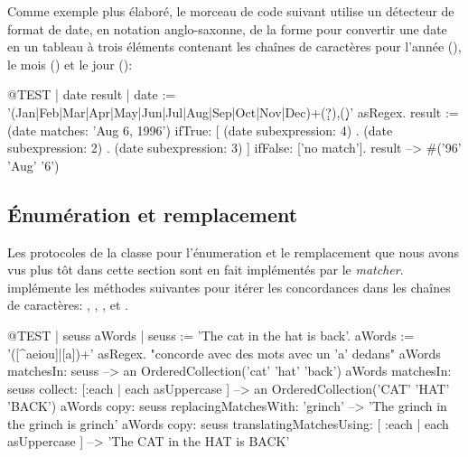 \documentclass[a4paper,10pt,twoside]{book}
\begin{document}
Comme exemple plus élaboré, le morceau de code suivant utilise un
détecteur de format de date,
en notation anglo-saxonne,
de la forme \mbox{}  pour convertir une date en un tableau à
trois éléments contenant les chaînes de caractères pour l'année
(), le mois () et le jour ():

\begin{code}{@TEST | date result |}
date := '(Jan|Feb|Mar|Apr|May|Jun|Jul|Aug|Sep|Oct|Nov|Dec)\s+(\d\d?)\s*,(\d\d)' asRegex.
result := (date matches: 'Aug 6, 1996')
       ifTrue: [{ (date subexpression: 4) .
				(date subexpression: 2) .
				(date subexpression: 3) } ]
        ifFalse: ['no match'].
result --> #('96' 'Aug' '6')
\end{code}

\subsection{Énumération et remplacement}

Les protocoles de la classe  pour l'énumeration
 et le remplacement que nous avons vus plus tôt
dans cette section sont en fait implémentés par le \emph{matcher}. 
 implémente les méthodes suivantes pour itérer les
concordances dans les chaînes de caractères:
,
,
,
 et
.

\begin{code}{@TEST | seuss aWords |}
seuss := 'The cat in the hat is back'.
aWords := '\<([^aeiou]|[a])+\>' asRegex.    "concorde avec des mots avec un 'a' dedans"
aWords matchesIn: seuss
    --> an OrderedCollection('cat' 'hat' 'back')
aWords matchesIn: seuss collect: [:each | each asUppercase ]
    --> an OrderedCollection('CAT' 'HAT' 'BACK')
aWords copy: seuss replacingMatchesWith: 'grinch'
    --> 'The grinch in the grinch is grinch'
aWords copy: seuss translatingMatchesUsing: [ :each | each asUppercase ]
    --> 'The CAT in the HAT is BACK'
\end{code} %
\end{document}
